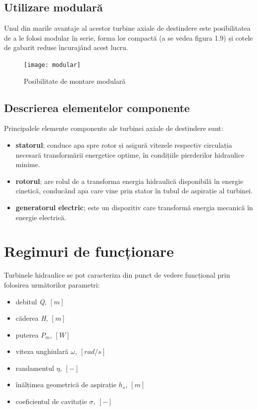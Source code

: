 \clearpage


\subsection{Utilizare modulară}
Unul din marile avantaje al acestor turbine axiale de destindere este posibilitatea de a le folosi modular în serie, forma lor compactă (a se vedea figura 1.9) și cotele de gabarit reduse încurajând acest lucru.

\begin{figure}[h!]
	\centering
	\texttt{[image: modular]}
	\caption{Posibilitate de montare modulară \protect\cite{hasmatuchi2014new}}
	\label{Posibilitate de montare modulară}
\end{figure}

\subsection{Descrierea elementelor componente}

Principalele elemente componente ale turbinei axiale de destindere sunt:

\begin{itemize}
	\item \textbf{statorul}; conduce apa spre rotor și asigură vitezele respectiv circulația necesară transformării energetice optime, în condițiile pierderilor hidraulice minime.
	\item \textbf{rotorul}; are rolul de a transforma energia hidraulică disponibilă în energie cinetică, conducând apa care vine prin stator în tubul de aspirație al turbinei.
	\item \textbf{generatorul electric}; este un dispozitiv care transformă energia mecanică în energie electrică.
\end{itemize}


\section{Regimuri de funcționare}

Turbinele hidraulice se pot caracteriza din punct de vedere funcțional prin folosirea următorilor parametri:

\begin{itemize}
	\item debitul \textit{Q, $[\si{m}]$}
	\item căderea \textit{H, $[\si{m}]$}
	\item puterea \textit{$P_m$, $[\si{W}]$}
	\item viteza unghiular\u{a} \textit{\(\omega\), $[\si{rad/s}]$}
	\item randamentul \textit{\(\eta\), $[-]$}
	\item înălțimea geometrică de aspirație \textit{\(h_s\), $[\si{m}]$}
	\item coeficientul de cavitație \textit{\(\sigma\), $[-]$}
\end{itemize}


